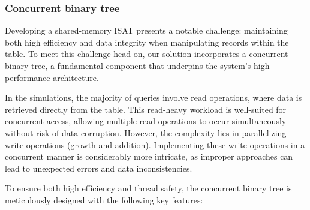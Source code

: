 \subsubsection{Concurrent binary tree}

Developing a shared-memory ISAT presents a notable challenge: maintaining both high efficiency and data integrity when manipulating records within the table. To meet this challenge head-on, our solution incorporates a concurrent binary tree, a fundamental component that underpins the system's high-performance architecture.

In the simulations, the majority of queries involve read operations, where data is retrieved directly from the table. This read-heavy workload is well-suited for concurrent access, allowing multiple read operations to occur simultaneously without risk of data corruption. However, the complexity lies in parallelizing write operations (growth and addition). Implementing these write operations in a concurrent manner is considerably more intricate, as improper approaches can lead to unexpected errors and data inconsistencies.

To ensure both high efficiency and thread safety, the concurrent binary tree is meticulously designed with the following key features:

